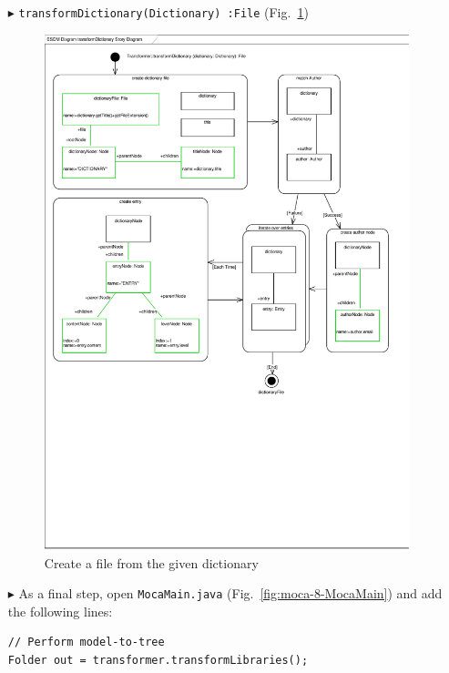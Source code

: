 \begin{enumerate}
\item[$\blacktriangleright$] \texttt{transformDictionary(Dictionary)~:File}
  (Fig.~\ref{fig:moca-transformDictionary})    
\begin{figure}[!htbp]
\begin{center}
 \includegraphics[width=\textwidth]{pics/moca/4ModelToMocaTree/transformDictionary}
  \caption{Create a file from the given dictionary} 
  \label{fig:moca-transformDictionary}
\end{center}
\end{figure} 


\item[$\blacktriangleright$] As a final step, open \texttt{MocaMain.java}
(Fig.~\ref{fig:moca-8-MocaMain}) and add the following lines:
\begin{verbatim}
// Perform model-to-tree 
Folder out = transformer.transformLibraries();
\end{verbatim}
\end{enumerate}